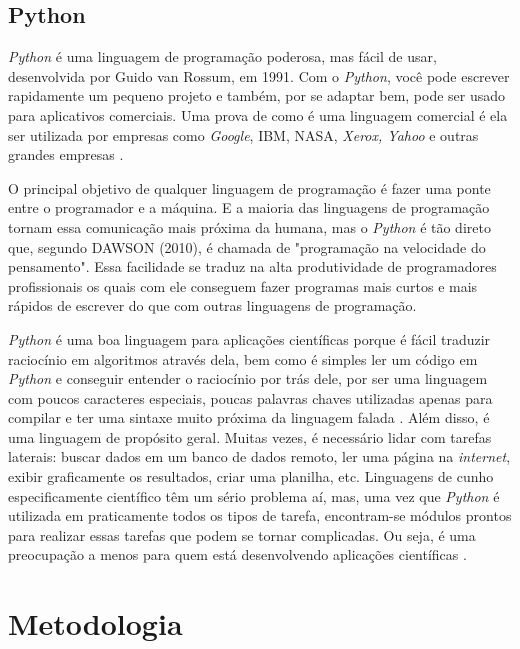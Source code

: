 \section{Python}

\textit{Python} é uma linguagem de programação poderosa, mas fácil de usar, desenvolvida por Guido van Rossum, em 1991. Com o \textit{Python}, você pode escrever rapidamente um pequeno projeto e também, por se adaptar bem, pode ser usado para aplicativos comerciais. Uma prova de como é uma linguagem comercial é ela ser utilizada por empresas como \textit{Google}, IBM, NASA, \textit{Xerox, Yahoo} e outras grandes empresas \cite{dawson2010}.

O principal objetivo de qualquer linguagem de programação é fazer uma ponte entre o programador e a máquina. E a maioria das linguagens de programação tornam essa comunicação mais próxima da humana, mas o \textit{Python} é tão direto que, segundo DAWSON (2010), é chamada de "programação na velocidade do pensamento". Essa facilidade se traduz na alta produtividade de programadores profissionais os quais com ele conseguem fazer programas mais curtos e mais rápidos de escrever do que com outras linguagens de programação. 

\textit{Python} é uma boa linguagem para aplicações científicas porque é fácil traduzir raciocínio em algoritmos através dela, bem como é simples ler um código em \textit{Python} e conseguir entender o raciocínio por trás dele, por ser uma linguagem com poucos caracteres especiais, poucas palavras chaves utilizadas apenas para compilar e ter uma sintaxe muito próxima da linguagem falada \cite{reitz2018}. Além disso, é uma linguagem de propósito geral. Muitas vezes, é necessário lidar com tarefas laterais: buscar dados em um banco de dados remoto, ler uma página na \textit{internet}, exibir graficamente os resultados, criar uma planilha, etc. Linguagens de cunho especificamente científico têm um sério problema aí, mas, uma vez que \textit{Python} é utilizada em praticamente todos os tipos de tarefa, encontram-se módulos prontos para realizar essas tarefas que podem se tornar complicadas. Ou seja, é uma preocupação a menos para quem está desenvolvendo aplicações científicas \cite{downey2012}.
  

\chapter[Metodologia]{Metodologia}

